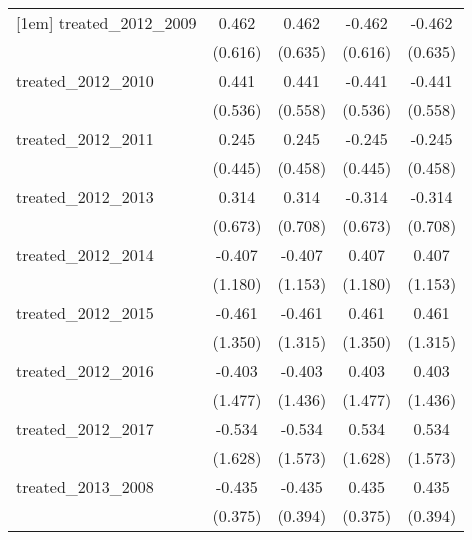 {\begin{tabular}{l*{4}{c}}
[1em]
treated\_2012\_2009&       0.462         &       0.462         &      -0.462         &      -0.462         \\
            &     (0.616)         &     (0.635)         &     (0.616)         &     (0.635)         \\
[1em]
treated\_2012\_2010&       0.441         &       0.441         &      -0.441         &      -0.441         \\
            &     (0.536)         &     (0.558)         &     (0.536)         &     (0.558)         \\
[1em]
treated\_2012\_2011&       0.245         &       0.245         &      -0.245         &      -0.245         \\
            &     (0.445)         &     (0.458)         &     (0.445)         &     (0.458)         \\
[1em]
treated\_2012\_2013&       0.314         &       0.314         &      -0.314         &      -0.314         \\
            &     (0.673)         &     (0.708)         &     (0.673)         &     (0.708)         \\
[1em]
treated\_2012\_2014&      -0.407         &      -0.407         &       0.407         &       0.407         \\
            &     (1.180)         &     (1.153)         &     (1.180)         &     (1.153)         \\
[1em]
treated\_2012\_2015&      -0.461         &      -0.461         &       0.461         &       0.461         \\
            &     (1.350)         &     (1.315)         &     (1.350)         &     (1.315)         \\
[1em]
treated\_2012\_2016&      -0.403         &      -0.403         &       0.403         &       0.403         \\
            &     (1.477)         &     (1.436)         &     (1.477)         &     (1.436)         \\
[1em]
treated\_2012\_2017&      -0.534         &      -0.534         &       0.534         &       0.534         \\
            &     (1.628)         &     (1.573)         &     (1.628)         &     (1.573)         \\
[1em]
treated\_2013\_2008&      -0.435         &      -0.435         &       0.435         &       0.435         \\
            &     (0.375)         &     (0.394)         &     (0.375)         &     (0.394)         \\

\end{tabular}}
